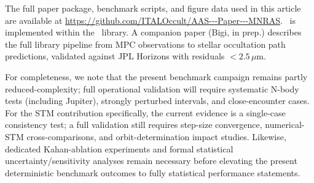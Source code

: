 The full paper package, benchmark scripts, and figure data used in this
article are available at \url{https://github.com/ITALOccult/AAS---Paper---MNRAS}.
\AAS\ is implemented within the \astdyn\ library.
A companion paper (Bigi, in prep.) describes the
full library pipeline from MPC observations to stellar occultation
path predictions, validated against JPL Horizons with residuals
$< 2.5\,\mu$m.

For completeness, we note that the present benchmark campaign remains
partly reduced-complexity; full operational validation will require
systematic N-body tests (including Jupiter), strongly perturbed
intervals, and close-encounter cases.
For the STM contribution specifically, the current evidence is a
single-case consistency test; a full validation still requires
step-size convergence, numerical-STM cross-comparisons, and
orbit-determination impact studies.
Likewise, dedicated Kahan-ablation experiments and formal statistical
uncertainty/sensitivity analyses remain necessary before elevating
the present deterministic benchmark outcomes to fully statistical
performance statements.
